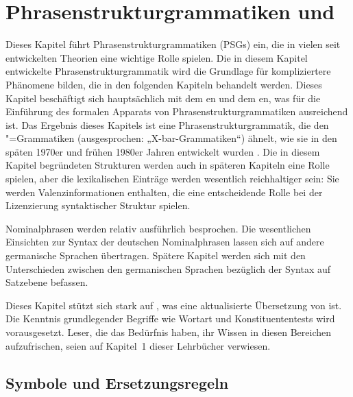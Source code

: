 \chapter{Phrasenstrukturgrammatiken und \xbart}
\label{chap-psg-xbar}\label{chap-psg}

Dieses Kapitel führt Phrasenstrukturgrammatiken (PSGs) ein, die in vielen seit 
entwickelten Theorien eine wichtige Rolle spielen. Die in diesem Kapitel entwickelte
Phrasenstrukturgrammatik wird die Grundlage für kompliziertere Phänomene bilden, die in den folgenden
Kapiteln behandelt werden. Dieses Kapitel beschäftigt sich hauptsächlich mit dem en und dem
en, was für die Einführung des formalen Apparats von Phrasenstrukturgrammatiken
ausreichend ist. Das Ergebnis dieses Kapitels ist eine Phrasenstrukturgrammatik, die den
\xbar"=Grammatiken (ausgesprochen: „X-bar-Grammatiken``) ähnelt, wie sie in den späten 1970er und frühen
1980er Jahren entwickelt wurden
\citep{Chomsky70a,Jackendoff77a}. Die in diesem Kapitel begründeten Strukturen werden auch in
späteren Kapiteln eine Rolle spielen, aber die lexikalischen Einträge werden wesentlich reichhaltiger
sein: Sie werden Valenzinformationen enthalten, die eine entscheidende Rolle bei der Lizenzierung
syntaktischer Struktur spielen.

Nominalphrasen werden relativ ausführlich besprochen. Die wesentlichen Einsichten zur Syntax
der deutschen Nominalphrasen lassen sich auf andere germanische Sprachen übertragen. Spätere
Kapitel werden sich mit den Unterschieden zwischen den germanischen Sprachen bezüglich der Syntax
auf Satzebene befassen.

Dieses Kapitel stützt sich stark auf , was eine aktualisierte
Übersetzung von  ist. Die Kenntnis grundlegender Begriffe wie Wortart
und Konstituententests wird vorausgesetzt. Leser, die das Bedürfnis haben, ihr Wissen in diesen
Bereichen aufzufrischen, seien auf Kapitel~1 dieser Lehrbücher verwiesen.

\section{Symbole und Ersetzungsregeln}
\label{sec-simple-psg}

